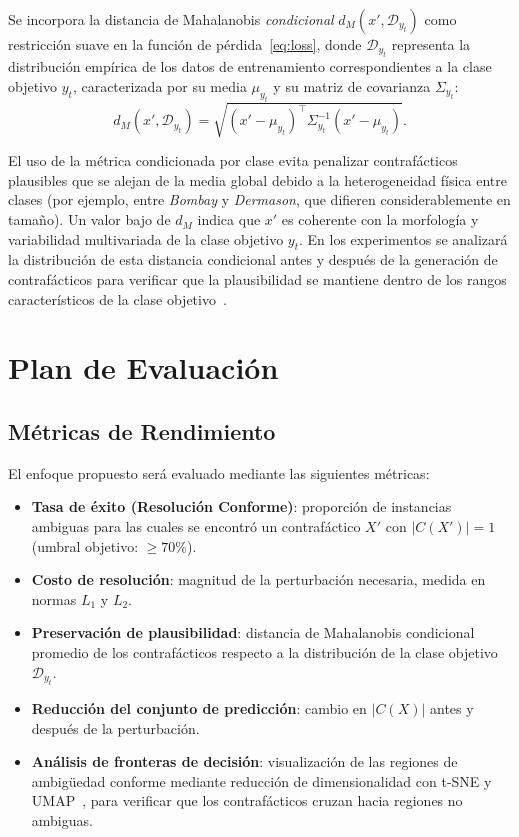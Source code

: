 \documentclass[conference]{IEEEtran}
\begin{document}
Se incorpora la distancia de Mahalanobis \emph{condicional}
$d_M(x', \mathcal{D}_{y_t})$ como restricción suave en la función de
pérdida~\eqref{eq:loss}, donde $\mathcal{D}_{y_t}$ representa la
distribución empírica de los datos de entrenamiento correspondientes
a la clase objetivo $y_t$, caracterizada por su media $\mu_{y_t}$ y
su matriz de covarianza $\Sigma_{y_t}$:
\begin{equation}
    d_M(x', \mathcal{D}_{y_t}) =
    \sqrt{(x' - \mu_{y_t})^\top \Sigma_{y_t}^{-1} (x' - \mu_{y_t})}.
    \label{eq:maha}
\end{equation}

El uso de la métrica condicionada por clase evita penalizar
contrafácticos plausibles que se alejan de la media global debido a la
heterogeneidad física entre clases (por ejemplo, entre \textit{Bombay}
y \textit{Dermason}, que difieren considerablemente en tamaño). Un valor
bajo de $d_M$ indica que $x'$ es coherente con la morfología y
variabilidad multivariada de la clase objetivo $y_t$. En los experimentos
se analizará la distribución de esta distancia condicional antes y después
de la generación de contrafácticos para verificar que la plausibilidad se
mantiene dentro de los rangos característicos de la clase objetivo~\cite{b10}.

\section{Plan de Evaluación}

\subsection{Métricas de Rendimiento}

El enfoque propuesto será evaluado mediante las siguientes métricas:
\begin{itemize}
    \item[$\bullet$] \textbf{Tasa de éxito (Resolución Conforme)}:
    proporción de instancias ambiguas para las cuales se encontró un
    contrafáctico $X'$ con $|C(X')| = 1$ (umbral objetivo: $\geq 70\%$).

    \item[$\bullet$] \textbf{Costo de resolución}: magnitud de la
    perturbación necesaria, medida en normas $L_1$ y $L_2$.

    \item[$\bullet$] \textbf{Preservación de plausibilidad}: distancia
    de Mahalanobis condicional promedio de los contrafácticos respecto
    a la distribución de la clase objetivo $\mathcal{D}_{y_t}$.

    \item[$\bullet$] \textbf{Reducción del conjunto de predicción}:
    cambio en $|C(X)|$ antes y después de la perturbación.

    \item[$\bullet$] \textbf{Análisis de fronteras de decisión}:
    visualización de las regiones de ambigüedad conforme mediante
    reducción de dimensionalidad con t-SNE y UMAP~\cite{b11,b12}, para
    verificar que los contrafácticos cruzan hacia regiones no ambiguas.
\end{itemize}
\end{document}
